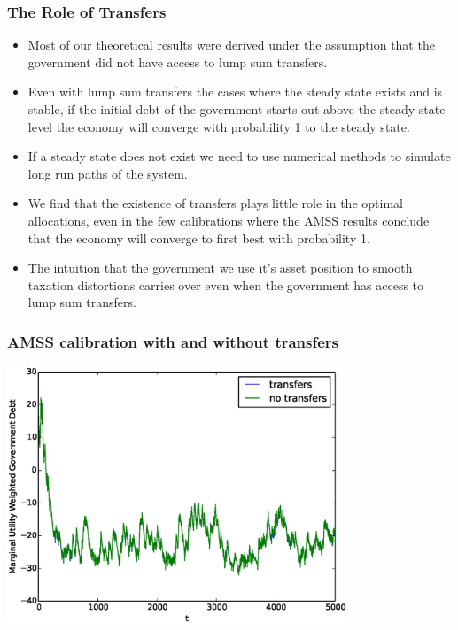\documentclass{beamer}
\begin{document}
 \begin{frame}
  \frametitle{The Role of Transfers}
	\begin{itemize}
		\item  Most of our theoretical results were derived under the assumption that the government did not have access to lump sum transfers.
		\item  Even with lump sum transfers the cases where the steady state exists and is stable, if the initial debt of the government starts out above the steady state level the economy will converge with probability 1 to the steady state.
		\item  If a steady state does not exist we need to use numerical methods to simulate long run paths of the system.
		\item  We find that the existence of transfers plays little role in the optimal allocations, even in the few calibrations where the AMSS results conclude that the economy will converge to first best with probability 1.
		\item  The intuition that the government we use it's asset position to smooth taxation distortions carries over even when the government has access to lump sum transfers.
	\end{itemize}
 \end{frame}

 \begin{frame}
	\frametitle{AMSS calibration with and without transfers}
	\begin{center}
	\includegraphics[width=4in]{Images/transfer_example1.eps}
	\end{center}
\end{frame}
\end{document}
